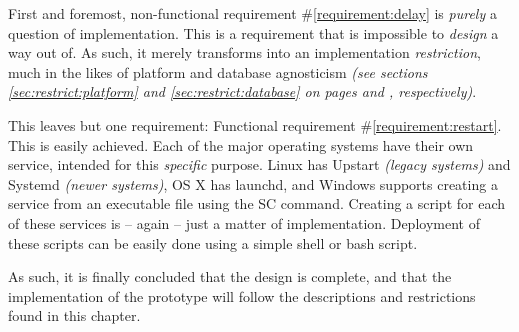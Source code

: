		First and foremost, non-functional requirement \#\ref{requirement:delay} is \emph{purely} a question of implementation. This is a requirement that is impossible to \emph{design} a way out of. As such, it merely transforms into an implementation \emph{restriction}, much in the likes of platform and database agnosticism \emph{(see sections \ref{sec:restrict:platform} and \ref{sec:restrict:database} on pages \pageref{sec:restrict:platform} and \pageref{sec:restrict:database}, respectively)}.

		This leaves but one requirement: Functional requirement \#\ref{requirement:restart}. This is easily achieved. Each of the major operating systems have their own service, intended for this \emph{specific} purpose. Linux has Upstart \emph{(legacy systems)} and Systemd \emph{(newer systems)}\cite{autostart:linux}, OS X has launchd\cite{autostart:osx}, and Windows supports creating a service from an executable file using the SC command\cite{autostart:windows}. Creating a script for each of these services is -- again -- just a matter of implementation. Deployment of these scripts can be easily done using a simple shell or bash script.

		As such, it is finally concluded that the design is complete, and that the implementation of the prototype will follow the descriptions and restrictions found in this chapter.


